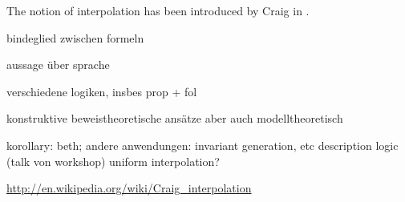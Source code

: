 
The notion of interpolation has been introduced by Craig in \cite{craig57linear}.

bindeglied zwischen formeln

aussage über sprache

verschiedene logiken, insbes prop + fol

konstruktive beweistheoretische ansätze aber auch modelltheoretisch

korollary: beth; andere anwendungen: invariant generation, etc
description logic (talk von workshop)
	uniform interpolation?

\url{http://en.wikipedia.org/wiki/Craig_interpolation}


